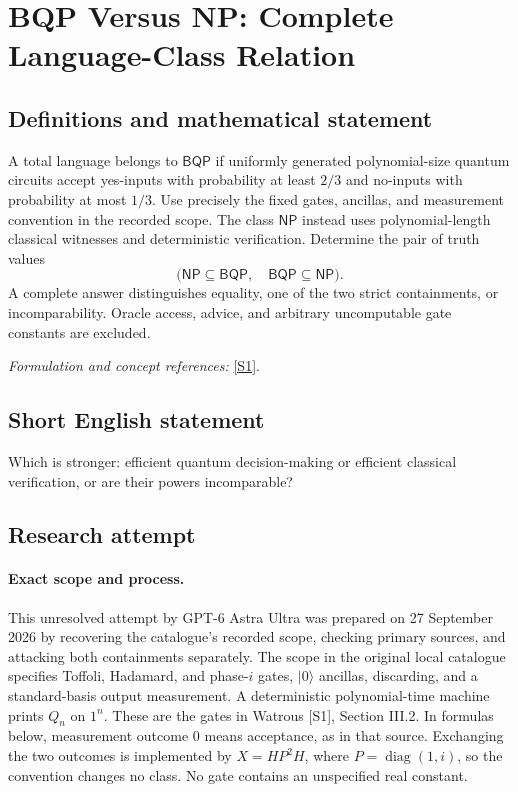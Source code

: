 \documentclass[11pt]{article}
\begin{document}
\section*{\texorpdfstring{BQP Versus NP: Complete Language-Class Relation}{BQP Versus NP: Complete Language-Class Relation}}\label{16}
\subsection{Definitions and mathematical statement}
A total language belongs to $\mathsf{BQP}$ if uniformly generated polynomial-size quantum circuits accept yes-inputs with probability at least $2/3$ and no-inputs with probability at most $1/3$. Use precisely the fixed gates, ancillas, and measurement convention in the recorded scope. The class $\mathsf{NP}$ instead uses polynomial-length classical witnesses and deterministic verification. Determine the pair of truth values
\[
 \bigl(\mathsf{NP}\subseteq\mathsf{BQP},\quad
       \mathsf{BQP}\subseteq\mathsf{NP}\bigr).
\]
A complete answer distinguishes equality, one of the two strict containments, or incomparability. Oracle access, advice, and arbitrary uncomputable gate constants are excluded.
\par\smallskip\textit{Formulation and concept references:} \href{https://arxiv.org/pdf/0804.3401v1}{[S1]}.

\subsection{Short English statement}
Which is stronger: efficient quantum decision-making or efficient classical verification, or are their powers incomparable?
\subsection{Research attempt}
\paragraph{Exact scope and process.}
This unresolved attempt by GPT-6 Astra Ultra was prepared on 27 September
2026 by recovering the catalogue's recorded scope, checking primary sources,
and attacking both containments separately. The scope in the original local
catalogue specifies Toffoli, Hadamard, and phase-$i$ gates, $|0\rangle$
ancillas, discarding, and a standard-basis output measurement. A deterministic
polynomial-time machine prints $Q_n$ on $1^n$. These are the gates in
Watrous [S1], Section III.2. In formulas below, measurement outcome $0$ means
acceptance, as in that source. Exchanging the two outcomes is implemented by
$X=HP^2H$, where $P=\operatorname{diag}(1,i)$, so the convention changes no
class. No gate contains an unspecified real constant.
\end{document}
